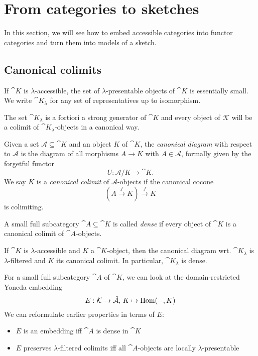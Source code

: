 \section{From categories to sketches}
\label{seq:catstoskeches}

In this section, we will see how to embed accessible categories into functor categories and turn them into models of a sketch.

\subsection{Canonical colimits}
\begin{Definition}
If $\cat K$ is $\lambda$-accessible, the set of $\lambda$-presentable objects of $\cat K$ is essentially small. We write $\cat K_\lambda$ for any set of representatives up to isomorphism.
\end{Definition}

The set $\cat K_\lambda$ is a fortiori a strong generator of $\cat K$ and every object of $\mathcal K$ will be a colimit of $\cat K_\lambda$-objects in a canonical way.

\begin{Definition}
Given a set $\mathcal A \subseteq \cat K$ and an object $K$ of $\cat K$, the \emph{canonical diagram} with respect to $\mathcal A$ is the diagram of all morphisms $A \to K$ with $A \in \mathcal A$, formally given by the forgetful functor
\[ U : \mathcal A/K \to \cat K. \]
We say $K$ is a \emph{canonical colimit} of $\mathcal A$-objects if the canonical cocone 
\[ (A \xrightarrow{f} K) \xrightarrow{f} K \]
is colimiting. 
\end{Definition}

\begin{Definition}
A small full subcategory $\cat A \subseteq \cat K$ is called \emph{dense} if every object of $\cat K$ is a canonical colimit of $\cat A$-objects.
\end{Definition}

\begin{Proposition}\label{prop:lpres}
If $\cat K$ is $\lambda$-accessible and $K$ a $\cat K$-object, then the canonical diagram wrt. $\cat K_\lambda$ is $\lambda$-filtered and $K$ its canonical colimit. In particular, $\cat K_\lambda$ is dense.
\end{Proposition}

\begin{Proposition}
For a small full subcategory $\cat A$ of $\cat K$, we can look at the domain-restricted Yoneda embedding
\[ E : \mathcal{K} \to \hat{\mathcal{A}}, \, K \mapsto \textrm{Hom}(-,K) \]
We can reformulate earlier properties in terms of $E$:
\begin{itemize}
\item $E$ is an embedding iff $\cat A$ is dense in $\cat K$
\item $E$ preserves $\lambda$-filtered colimits iff all $\cat A$-objects are locally $\lambda$-presentable
\end{itemize}
\end{Proposition}

